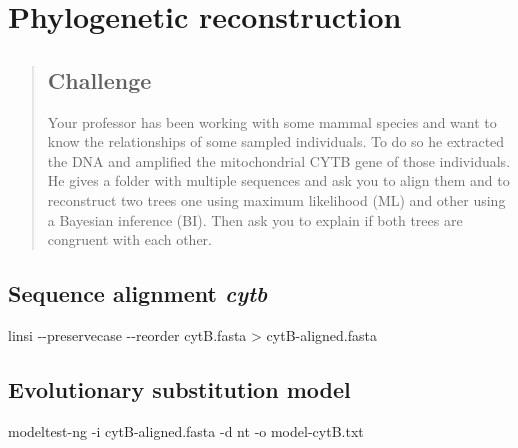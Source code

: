 \documentclass[
  letterpaper,
  DIV=11,
  numbers=noendperiod]{scrreprt}
\newenvironment{Shaded}{\begin{snugshade}}{\end{snugshade}}
\newcommand{\AttributeTok}[1]{\textcolor[rgb]{0.40,0.46,0.14}{#1}}
\newcommand{\ExtensionTok}[1]{\textcolor[rgb]{0.00,0.46,0.62}{#1}}
\newcommand{\NormalTok}[1]{\textcolor[rgb]{0.00,0.46,0.62}{#1}}
\newcommand{\OperatorTok}[1]{\textcolor[rgb]{0.37,0.37,0.37}{#1}}
\begin{document}
\hypertarget{phylogenetic-reconstruction}{%
\chapter{Phylogenetic
reconstruction}\label{phylogenetic-reconstruction}}

\begin{quote}
\hypertarget{challenge-3}{%
\section*{Challenge}\label{challenge-3}}

Your professor has been working with some mammal species and want to
know the relationships of some sampled individuals. To do so he
extracted the DNA and amplified the mitochondrial CYTB gene of those
individuals. He gives a folder with multiple sequences and ask you to
align them and to reconstruct two trees one using maximum likelihood
(ML) and other using a Bayesian inference (BI). Then ask you to explain
if both trees are congruent with each other.
\end{quote}

\hypertarget{sequence-alignment-cytb}{%
\section*{\texorpdfstring{Sequence alignment
\emph{cytb}}{Sequence alignment cytb}}\label{sequence-alignment-cytb}}

\begin{Shaded}
\begin{Highlighting}[]
\ExtensionTok{linsi} \AttributeTok{{-}{-}preservecase} \AttributeTok{{-}{-}reorder}\NormalTok{ cytB.fasta }\OperatorTok{\textgreater{}}\NormalTok{ cytB{-}aligned.fasta}
\end{Highlighting}
\end{Shaded}

\hypertarget{evolutionary-substitution-model}{%
\section*{Evolutionary substitution
model}\label{evolutionary-substitution-model}}

\begin{Shaded}
\begin{Highlighting}[]
\ExtensionTok{modeltest{-}ng} \AttributeTok{{-}i}\NormalTok{ cytB{-}aligned.fasta }\AttributeTok{{-}d}\NormalTok{ nt }\AttributeTok{{-}o}\NormalTok{ model{-}cytB.txt}
\end{Highlighting}
\end{Shaded}
\end{document}
